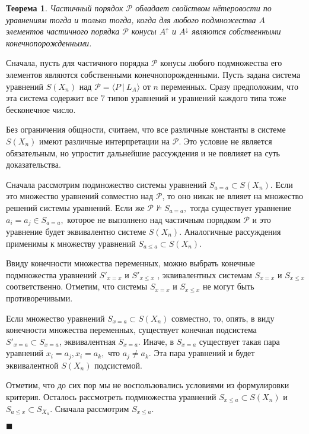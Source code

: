 \documentclass[12pt]{article}
\theoremstyle{break}
\newtheorem{Th}{Теорема}
\newenvironment{Proof} %
	{\par\noindent{\bf Доказательство.}} %
	{\hfill$\scriptstyle\blacksquare$} %
\def\P{\mathcal{P}}
\begin{document}
		\begin{Th}\label{criterion}
			Частичный порядок $\P$ обладает свойством нётеровости по уравнениям тогда и только тогда, когда для любого подмножества $A$ элементов частичного порядка $\P$ конусы $A^{\uparrow}$ и $A^{\downarrow}$ являются собственными конечнопорожденными.
		\end{Th}

		\begin{Proof}
			Сначала, пусть для частичного порядка $\P$ конусы любого подмножества его элементов являются собственными конечнопорожденными. Пусть задана система уравнений $S(X_n)$ над $\P = \langle P~|~L_A\rangle$ от $n$ переменных. Сразу предположим, что эта система содержит все 7 типов уравнений и уравнений каждого типа тоже бесконечное число.

			Без ограничения общности, считаем, что все различные константы в системе $S(X_n)$ имеют различные интерпретации на $\P$. Это условие не является обязательным, но упростит дальнейшие рассуждения и не повлияет на суть доказательства.

			Сначала рассмотрим подмножество системы уравнений $S_{a=a}\subset S(X_n)$. Если это множество уравнений совместно над $\P$, то оно никак не влияет на множество решений системы уравнений. Если же $\P\nvDash S_{a=a},$ тогда существует уравнение $a_i=a_j\in S_{a=a},$ которое не выполнено над частичным порядком $\P$ и это уравнение будет эквивалентно системе $S(X_n).$ Аналогичные рассуждения применимы к множеству уравнений $S_{a\leqslant a}\subset S(X_n).$

			Ввиду конечности множества переменных, можно выбрать конечные подмножества уравнений $S'_{x=x}$ и $S'_{x\leqslant x}$ , эквивалентных системам $S_{x=x}$ и $S_{x\leqslant x}$ соответственно. Отметим, что системы $S_{x=x}$ и $S_{x\leqslant x}$ не могут быть противоречивыми.

			Если множество уравнений $S_{x=a}\subset S(X_n)$ совместно, то, опять, в виду конечности множества переменных, существует конечная подсистема $S'_{x=a}\subset S_{x=a}$, эквивалентная $S_{x=a}.$ Иначе, в $S_{x=a}$  существует такая пара уравнений $x_i=a_j, x_i=a_k,$ что $a_j\neq a_k$. Эта пара уравнений и будет эквивалентной $S(X_n)$ подсистемой.

			Отметим, что до сих пор мы не воспользовались условиями из формулировки критерия. Осталось рассмотреть подмножества уравнений $S_{x\leqslant a}\subset S(X_n)$ и $S_{a\leqslant x}\subset S_{X_n}$. Сначала рассмотрим $S_{x\leqslant a}$.


\end{Proof}
\end{document}
